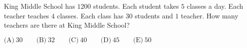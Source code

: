 

King Middle School has $1200$ students. Each student takes $5$ classes a day. Each teacher teaches $4$ classes. Each class has $30$ students and $1$ teacher. How many teachers are there at King Middle School?

$\text{(A)}\ 30 \qquad \text{(B)}\ 32 \qquad \text{(C)}\ 40 \qquad \text{(D)}\ 45 \qquad \text{(E)}\ 50$
